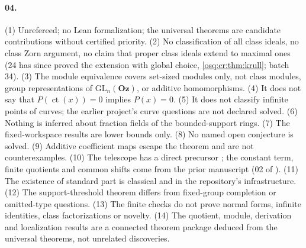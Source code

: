 \documentclass[11pt,letterpaper]{article}
\numberwithin{equation}{section}
\theoremstyle{definition}
\theoremstyle{remark}
\theoremstyle{plain}
\newcommand{\Oz}{\mathbf{Oz}}
\newcommand{\ct}{\operatorname{ct}}
\begin{document}
\paragraph{04.} (1) Unrefereed; no Lean formalization; the universal theorems are candidate
contributions without certified priority. (2) No classification of all class ideals, no class Zorn
argument, no claim that proper class ideals extend to maximal ones (24 has since proved the extension with global choice,
\cref{osq:cr:thm:krull}; batch 34). (3) The module equivalence covers
set-sized modules only, not class modules, group representations of $\mathrm{GL}_n(\Oz)$, or
additive homomorphisms. (4) It does not say that $P(\ct(x))=0$ implies $P(x)=0$. (5) It does not
classify infinite points of curves; the earlier project's curve questions are not declared solved.
(6) Nothing is inferred about fraction fields of the bounded-support rings. (7) The fixed-workspace
results are lower bounds only. (8) No named open conjecture is solved. (9) Additive coefficient maps
escape the theorem and are not counterexamples. (10) The telescope has a direct precursor
\cite[Remark~3.4.4]{LM}; the constant term, finite quotients and common shifts come from the prior
manuscript (02 of \cite{RepoOdg}). (11) The existence of standard part is classical and in the
repository's infrastructure. (12) The support-threshold theorem differs from fixed-group completion or
omitted-type questions. (13) The finite checks do not prove normal forms, infinite identities, class
factorizations or novelty. (14) The quotient, module, derivation and localization results are a
connected theorem package deduced from the universal theorems, not unrelated discoveries.
\end{document}
